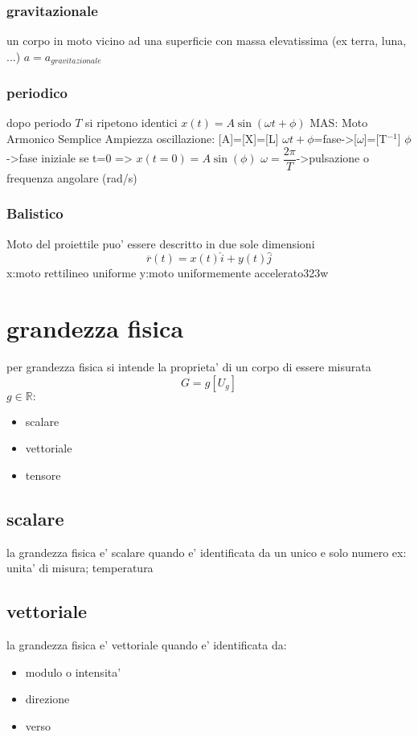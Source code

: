 \documentclass{book}
\begin{document}
\subsubsection{gravitazionale}
un corpo in moto vicino ad una superficie con massa elevatissima (ex terra, luna, ...)
$a=a_{gravitazionale}$
\subsubsection{periodico}
dopo periodo $T$ si ripetono identici
$x(t)=A\sin(\omega t+ \phi)$ 
MAS: Moto Armonico Semplice
Ampiezza oscillazione: [A]=[X]=[L]
$\omega t + \phi$=fase->[$\omega$]=[T$^{-1}$]
$\phi$->fase iniziale
se t=0 => $x(t=0)=A \sin (\phi)$
$\omega=\dfrac{2\pi}{T}$->pulsazione o frequenza angolare (rad/s)

\subsubsection{Balistico}
Moto del proiettile \newline
puo' essere descritto in due sole dimensioni
$$\overline{r}(t)=x(t)\hat{i}+y(t)\hat{j}$$
x:moto rettilineo uniforme \newline
y:moto uniformemente accelerato323w
\section{grandezza fisica}
per grandezza fisica si intende la proprieta' di un corpo di essere misurata
$$G=g[U_g]$$
$g \in \mathbb{R}:$
\begin{itemize}
    \item scalare
    \item vettoriale
    \item tensore
\end{itemize}
\subsection{scalare}
la grandezza fisica e' scalare quando e' identificata da un unico e solo numero
ex: unita' di misura; temperatura
\subsection{vettoriale}
la grandezza fisica e' vettoriale quando e' identificata da:
\begin{itemize}
    \item modulo o intensita'
    \item direzione
    \item verso
\end{itemize}
\end{document}
